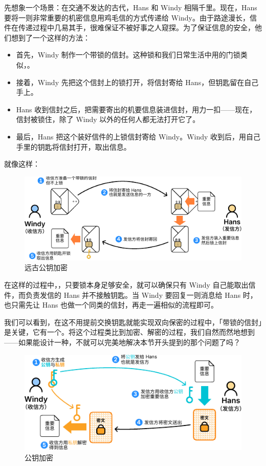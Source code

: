 先想象一个场景：在交通不发达的古代，Hans 和 Windy 相隔千里。现在，Hans 要将一则非常重要的机密信息用鸡毛信的方式传递给 Windy。由于路途漫长，信件在传递过程中几易其手，很难保证不被好事之人窥探。为了保证信息的安全，他们想到了一个这样的方法：

\begin{itemize}
  \item 首先，Windy 制作一个带锁的信封。这种锁和我们日常生活中用的门锁类似，。
  \item 接着，Windy 先把这个信封上的锁打开，将信封寄给 Hans，但钥匙留在自己手上。
  \item Hans 收到信封之后，把需要寄出的机要信息装进信封，用力一扣——现在，信封被锁住，除了 Windy 以外的任何人都无法打开它了。
  \item 最后，Hans 把这个装好信件的上锁信封寄给 Windy。Windy 收到后，用自己手里的钥匙将信封打开，取出信息。
\end{itemize}

就像这样：

\begin{figure}[htb!]
  \centering
  \includegraphics[width=.8\textwidth]{assets/surpass/Ancient_public_key_encryption.pdf}
  \caption{远古公钥加密}
  \label{fig:Ancient_public_key_encryption}
\end{figure}

在这样的过程中，，只要锁本身足够安全，就可以确保只有 Windy 自己能取出信件，而负责发信的 Hans 并不接触钥匙。当 Windy 要回复一则消息给 Hans 时，也只需先让 Hans 也做一个同类的信封，再走一遍相似的流程即可。

我们可以看到，在这不用提前交换钥匙就能实现双向保密的过程中，「带锁的信封」是关键，它有一个。将这个过程类比到加密、解密的过程，我们自然而然地想到——如果能设计一种，不就可以完美地解决本节开头提到的那个问题了吗？

\begin{figure}[htb!]
  \centering
  \includegraphics[width=.8\textwidth]{assets/surpass/Public_key_encryption.pdf}
  \caption{公钥加密}
  \label{fig:Public_key_encryption}
\end{figure}


